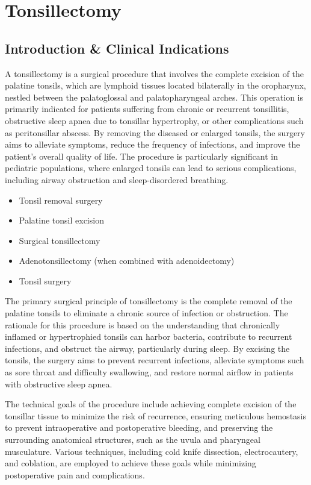 \chapter{Tonsillectomy}

\section*{Introduction \& Clinical Indications}
A tonsillectomy is a surgical procedure that involves the complete excision of the palatine tonsils, which are lymphoid tissues located bilaterally in the oropharynx, nestled between the palatoglossal and palatopharyngeal arches. This operation is primarily indicated for patients suffering from chronic or recurrent tonsillitis, obstructive sleep apnea due to tonsillar hypertrophy, or other complications such as peritonsillar abscess. By removing the diseased or enlarged tonsils, the surgery aims to alleviate symptoms, reduce the frequency of infections, and improve the patient's overall quality of life. The procedure is particularly significant in pediatric populations, where enlarged tonsils can lead to serious complications, including airway obstruction and sleep-disordered breathing.

\begin{itemize}
  \item Tonsil removal surgery
  \item Palatine tonsil excision
  \item Surgical tonsillectomy
  \item Adenotonsillectomy (when combined with adenoidectomy)
  \item Tonsil surgery
\end{itemize}

The primary surgical principle of tonsillectomy is the complete removal of the palatine tonsils to eliminate a chronic source of infection or obstruction. The rationale for this procedure is based on the understanding that chronically inflamed or hypertrophied tonsils can harbor bacteria, contribute to recurrent infections, and obstruct the airway, particularly during sleep. By excising the tonsils, the surgery aims to prevent recurrent infections, alleviate symptoms such as sore throat and difficulty swallowing, and restore normal airflow in patients with obstructive sleep apnea.

The technical goals of the procedure include achieving complete excision of the tonsillar tissue to minimize the risk of recurrence, ensuring meticulous hemostasis to prevent intraoperative and postoperative bleeding, and preserving the surrounding anatomical structures, such as the uvula and pharyngeal musculature. Various techniques, including cold knife dissection, electrocautery, and coblation, are employed to achieve these goals while minimizing postoperative pain and complications.


